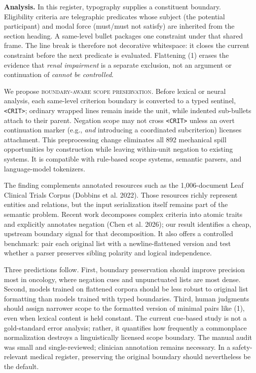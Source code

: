 \documentclass[12pt]{article}
\newcommand{\ex}[1]{\textit{#1}}
\begin{document}
\newpage
\textbf{Analysis.}
In this register, typography supplies a constituent boundary. Eligibility
criteria are telegraphic predicates whose subject (the potential participant)
and modal force (must/must not satisfy) are inherited from the section heading.
A same-level bullet packages one constraint under that shared frame. The line
break is therefore not decorative whitespace: it closes the current constraint
before the next predicate is evaluated. Flattening (1) erases the evidence that
\ex{renal impairment} is a separate exclusion, not an argument or continuation
of \ex{cannot be controlled}.

We propose \textsc{boundary-aware scope preservation}. Before lexical or neural
analysis, each same-level criterion boundary is converted to a typed sentinel,
\texttt{<CRIT>}; ordinary wrapped lines remain inside the unit, while indented
sub-bullets attach to their parent. Negation scope may not cross \texttt{<CRIT>}
unless an overt continuation marker (e.g., \ex{and} introducing a coordinated
subcriterion) licenses attachment. This preprocessing change eliminates all
892 mechanical spill opportunities by construction while leaving within-unit
negation to existing systems. It is compatible with rule-based scope systems,
semantic parsers, and language-model tokenizers.

The finding complements annotated resources such as the 1,006-document Leaf
Clinical Trials Corpus (Dobbins et al. 2022). Those resources richly represent
entities and relations, but the input serialization itself remains part of the
semantic problem. Recent work decomposes complex criteria into atomic traits
and explicitly annotates negation (Chen et al. 2026); our result identifies a
cheap, upstream boundary signal for that decomposition. It also offers a
controlled benchmark: pair each original list with a newline-flattened version
and test whether a parser preserves sibling polarity and logical independence.

Three predictions follow. First, boundary preservation should improve
precision most in oncology, where negation cues and unpunctuated lists are most
dense. Second, models trained on flattened corpora should be less robust to
original list formatting than models trained with typed boundaries. Third,
human judgments should assign narrower scope to the formatted version of
minimal pairs like (1), even when lexical content is held constant. The current
cue-based study is not a gold-standard error analysis; rather, it quantifies
how frequently a commonplace normalization destroys a linguistically licensed
scope boundary. The manual audit was small and single-reviewed; clinician
annotation remains necessary. In a safety-relevant medical register, preserving
the original boundary should nevertheless be the default.
\end{document}
